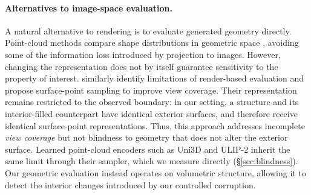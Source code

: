 
\paragraph{Alternatives to image-space evaluation.}
A natural alternative to rendering is to evaluate generated geometry directly. Point-cloud methods compare shape distributions in geometric space \citep{achlioptas2018pointclouds}, avoiding some of the information loss introduced by projection to images. However, changing the representation does not by itself guarantee sensitivity to the property of interest. \citet{luan2026rendermetric} similarly identify limitations of render-based evaluation and propose surface-point sampling to improve view coverage. Their representation remains restricted to the observed boundary: in our setting, a structure and its interior-filled counterpart have identical exterior surfaces, and therefore receive identical surface-point representations. Thus, this approach addresses incomplete \emph{view coverage} but not blindness to geometry that does not alter the exterior surface. Learned point-cloud encoders such as Uni3D \citep{zhou2024uni3d} and ULIP-2 \citep{xue2024ulip2} inherit the same limit through their sampler, which we measure directly (\S\ref{sec:blindness}). Our geometric evaluation instead operates on volumetric structure, allowing it to detect the interior changes introduced by our controlled corruption.

